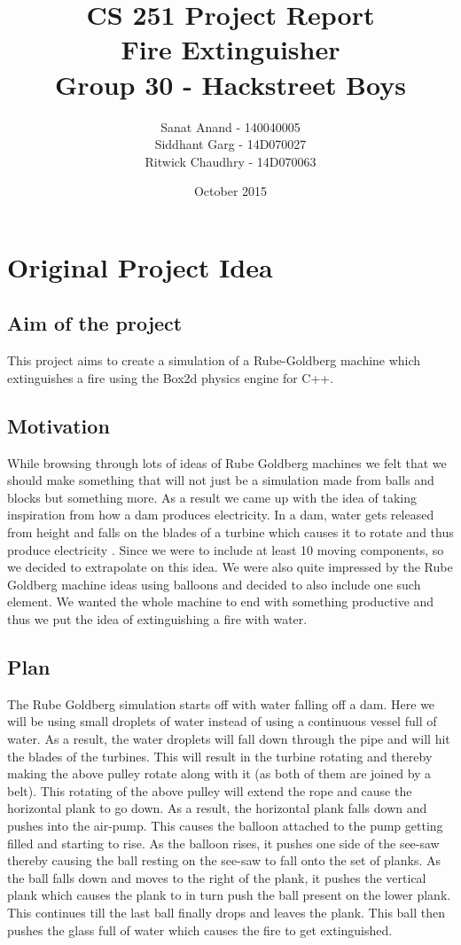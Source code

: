 \documentclass{report}
\title{CS 251 Project Report \\ Fire Extinguisher \\ Group 30 - Hackstreet Boys}
\author{Sanat Anand - 140040005 \\ Siddhant Garg - 14D070027 \\ Ritwick Chaudhry - 14D070063}
\date{October 2015}
\begin{document}
\maketitle

\tableofcontents
\pagebreak

\chapter{Original Project Idea}
\section{Aim of the project}
This project aims to create a simulation of a Rube-Goldberg machine which extinguishes a fire using the Box2d physics engine for C++.

\section{Motivation}
While browsing through lots of ideas of Rube Goldberg machines \cite{Rube-Goldberg} we felt that we should make something that will not just be a simulation made from balls and blocks but something more. As a result we came up with the idea of taking inspiration from how a dam produces electricity. In a dam, water gets released from height and falls on the blades of a turbine which causes it to rotate and thus produce electricity \cite{Hydro-pump}. Since we were to include at least 10 moving components, so we decided to extrapolate on this idea. We were also quite impressed by the Rube Goldberg machine ideas using balloons and decided to also include one such element. We wanted the whole machine to end with something productive and thus we put the idea of extinguishing a fire with water.\cite{Extinguisher}\\

\section{Plan}
The Rube Goldberg simulation starts off with water falling off a dam. Here we will be using small droplets of water instead of using a continuous vessel full of water. As a result, the water droplets will fall down through the pipe and will hit the blades of the turbines. This will result in the turbine rotating and thereby making the above pulley rotate along with it (as both of them are joined by a belt). This rotating of the above pulley will extend the rope and cause the horizontal plank to go down. As a result, the horizontal plank falls down and pushes into the air-pump. This causes the balloon attached to the pump getting filled and starting to rise. As the balloon rises, it pushes one side of the see-saw thereby causing the ball resting on the see-saw to fall onto the set of planks. As the ball falls down and moves to the right of the plank, it pushes the vertical plank which causes the plank to in turn push the ball present on the lower plank. This continues till the last ball finally drops and leaves the plank. This ball then pushes the glass full of water which causes the fire to get extinguished.\\
\end{document}
